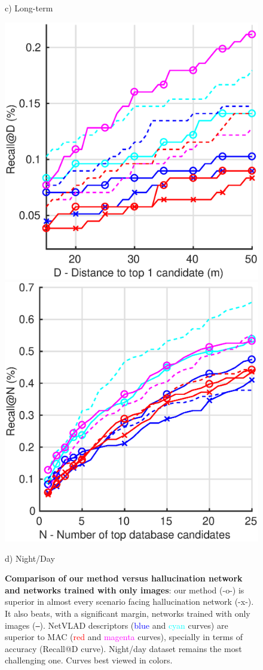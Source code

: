 \begin{figure}
\begin{minipage}{0.85\linewidth}
\begin{minipage}{0.49\linewidth}
		{\scriptsize c) Long-term}		
	\end{minipage}
	\begin{minipage}{0.49\linewidth}
		\center	
		\includegraphics[width=0.49\linewidth]{plot/fig/night_distance}	
		\includegraphics[width=0.49\linewidth]{plot/fig/night_recall}
	
		{\scriptsize d) Night/Day}
	\end{minipage}
	
	\end{minipage}

	\caption{\label{fig:results} \textbf{Comparison of our method versus hallucination network and networks trained with only images}: our method (-o-) is superior in almost every scenario facing hallucination network (-x-). It also beats, with a significant margin, networks trained with only images (\texttt{--}). NetVLAD descriptors (\textcolor{blue}{blue} and \textcolor{cyan}{cyan} curves) are superior to MAC (\textcolor{red}{red} and \textcolor{magenta}{magenta} curves), specially in terms of accuracy (Recall@D curve). Night/day dataset remains the most challenging one. Curves best viewed in colors.}
	\vspace{-0.25cm}
\end{figure}

